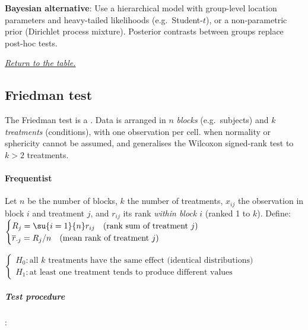 \textbf{Bayesian alternative}: Use a hierarchical model with group-level location
parameters and heavy-tailed likelihoods (e.g.\ Student-$t$), or a non-parametric prior
(Dirichlet process mixture). Posterior contrasts between groups replace post-hoc tests.

\textit{\hyperref[statistical_method_table]{Return to the table.}}

\subsection{Friedman test}

The Friedman test is a .
Data is arranged in $n$ \emph{blocks} (e.g.\ subjects) and $k$ \emph{treatments}
(conditions), with one observation per cell.  when normality or sphericity cannot be assumed, and generalises
the Wilcoxon signed-rank test to $k > 2$ treatments.

\paragraph{Frequentist}

Let $n$ be the number of blocks, $k$ the number of treatments, $x_{ij}$ the observation
in block $i$ and treatment $j$, and $r_{ij}$ its rank \emph{within block $i$} (ranked
1 to $k$). Define:
$\begin{cases}
    R_j = \su{i=1}{n} r_{ij} \quad \text{(rank sum of treatment } j\text{)} \\
    \overline{r}_{\cdot j} = R_j / n \quad \text{(mean rank of treatment } j\text{)}
\end{cases}$

$\begin{cases}
    H_0: \text{all } k \text{ treatments have the same effect (identical distributions)} \\
    H_1: \text{at least one treatment tends to produce different values}
\end{cases}$

\subparagraph{Test procedure}:

